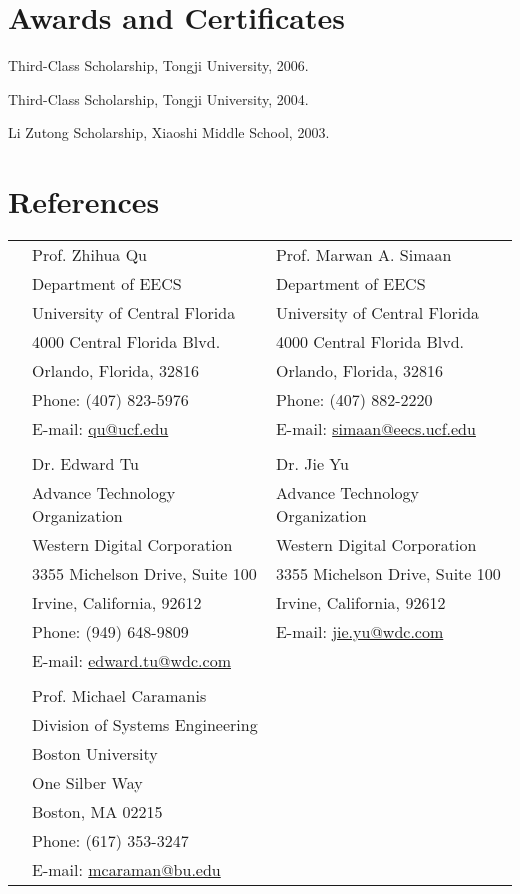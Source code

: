 \documentclass[margin,line]{res}
\newenvironment{list1}{
  \begin{list}{\ding{113}}{%
      \setlength{\itemsep}{0in}
      \setlength{\parsep}{0in} \setlength{\parskip}{0in}
      \setlength{\topsep}{0in} \setlength{\partopsep}{0in} 
      \setlength{\leftmargin}{0.17in}}}{\end{list}}
\begin{document}
\begin{resume}
\section{\sc Awards and Certificates} 
\begin{list1}
\item[] Third-Class Scholarship, Tongji University, 2006.
\item[] Third-Class Scholarship, Tongji University, 2004.
\item[] Li Zutong Scholarship, Xiaoshi Middle School, 2003.
\end{list1}

\section{\sc References}
\vspace{.05in}
\begin{tabular}{@{}p{0.20in}p{2.5in}p{3in}}
& Prof. Zhihua Qu                           
& Prof. Marwan A. Simaan \\
& Department of EECS                           
& Department of EECS \\
& University of Central Florida                       
& University of Central Florida \\
& 4000 Central Florida Blvd.                           
& 4000 Central Florida Blvd.\\
&Orlando, Florida, 32816
&Orlando, Florida, 32816\\
& Phone: (407) 823-5976
& Phone: (407) 882-2220 \\
& E-mail: \href{mailto:email@email.edu}{qu@ucf.edu} 
& E-mail: \href{mailto:email@email.edu}{simaan@eecs.ucf.edu} \\
&&\\
&Dr. Edward Tu 
&Dr. Jie Yu \\
&Advance Technology Organization
&Advance Technology Organization\\
& Western Digital Corporation
& Western Digital Corporation\\
&3355 Michelson Drive, Suite 100 
&3355 Michelson Drive, Suite 100\\
&Irvine, California, 92612
&Irvine, California, 92612\\
& Phone: (949) 648-9809
& E-mail: \href{mailto: Your email}{jie.yu@wdc.com}\\
& E-mail: \href{mailto: Your email}{edward.tu@wdc.com}\\
&&\\
&Prof. Michael Caramanis&\\  
&Division of Systems Engineering&\\
&Boston University&\\
&One Silber Way&\\
&Boston, MA 02215&\\
&Phone: (617) 353-3247&\\
&E-mail: \href{mailto: Your email}{mcaraman@bu.edu}&
\end{tabular}





\end{resume}
\end{document}
